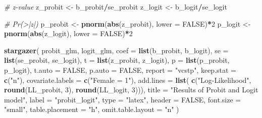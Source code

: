 \documentclass[
  12pt,
]{article}
\newenvironment{Shaded}{\begin{snugshade}}{\end{snugshade}}
\newcommand{\CommentTok}[1]{\textcolor[rgb]{0.56,0.35,0.01}{\textit{#1}}}
\newcommand{\DataTypeTok}[1]{\textcolor[rgb]{0.13,0.29,0.53}{#1}}
\newcommand{\DecValTok}[1]{\textcolor[rgb]{0.00,0.00,0.81}{#1}}
\newcommand{\KeywordTok}[1]{\textcolor[rgb]{0.13,0.29,0.53}{\textbf{#1}}}
\newcommand{\NormalTok}[1]{#1}
\newcommand{\OperatorTok}[1]{\textcolor[rgb]{0.81,0.36,0.00}{\textbf{#1}}}
\newcommand{\OtherTok}[1]{\textcolor[rgb]{0.56,0.35,0.01}{#1}}
\newcommand{\StringTok}[1]{\textcolor[rgb]{0.31,0.60,0.02}{#1}}
\begin{document}
\begin{Shaded}
\begin{Highlighting}[]
\CommentTok{\# z{-}value}
\NormalTok{z\_probit \textless{}{-}}\StringTok{ }\NormalTok{b\_probit}\OperatorTok{/}\NormalTok{se\_probit}
\NormalTok{z\_logit \textless{}{-}}\StringTok{ }\NormalTok{b\_logit}\OperatorTok{/}\NormalTok{se\_logit}

\CommentTok{\# Pr(\textgreater{}|z|)}
\NormalTok{p\_probit \textless{}{-}}\StringTok{ }\KeywordTok{pnorm}\NormalTok{(}\KeywordTok{abs}\NormalTok{(z\_probit), }\DataTypeTok{lower =} \OtherTok{FALSE}\NormalTok{)}\OperatorTok{*}\DecValTok{2}
\NormalTok{p\_logit \textless{}{-}}\StringTok{ }\KeywordTok{pnorm}\NormalTok{(}\KeywordTok{abs}\NormalTok{(z\_logit), }\DataTypeTok{lower =} \OtherTok{FALSE}\NormalTok{)}\OperatorTok{*}\DecValTok{2}

\KeywordTok{stargazer}\NormalTok{(}
\NormalTok{  probit\_glm, logit\_glm,}
  \DataTypeTok{coef =} \KeywordTok{list}\NormalTok{(b\_probit, b\_logit), }\DataTypeTok{se =} \KeywordTok{list}\NormalTok{(se\_probit, se\_logit),}
  \DataTypeTok{t =} \KeywordTok{list}\NormalTok{(z\_probit, z\_logit), }\DataTypeTok{p =} \KeywordTok{list}\NormalTok{(p\_probit, p\_logit),}
  \DataTypeTok{t.auto =} \OtherTok{FALSE}\NormalTok{, }\DataTypeTok{p.auto =} \OtherTok{FALSE}\NormalTok{,}
  \DataTypeTok{report =} \StringTok{"vcstp"}\NormalTok{, }\DataTypeTok{keep.stat =} \KeywordTok{c}\NormalTok{(}\StringTok{"n"}\NormalTok{),}
  \DataTypeTok{covariate.labels =} \KeywordTok{c}\NormalTok{(}\StringTok{"Female = 1"}\NormalTok{),}
  \DataTypeTok{add.lines =} \KeywordTok{list}\NormalTok{(}
    \KeywordTok{c}\NormalTok{(}\StringTok{"Log{-}Likelihood"}\NormalTok{, }\KeywordTok{round}\NormalTok{(LL\_probit, }\DecValTok{3}\NormalTok{), }\KeywordTok{round}\NormalTok{(LL\_logit, }\DecValTok{3}\NormalTok{))),}
  \DataTypeTok{title =} \StringTok{"Results of Probit and Logit model"}\NormalTok{,}
  \DataTypeTok{label =} \StringTok{"probit\_logit"}\NormalTok{,}
  \DataTypeTok{type =} \StringTok{"latex"}\NormalTok{, }\DataTypeTok{header =} \OtherTok{FALSE}\NormalTok{, }\DataTypeTok{font.size =} \StringTok{"small"}\NormalTok{,}
  \DataTypeTok{table.placement =} \StringTok{"h"}\NormalTok{, }\DataTypeTok{omit.table.layout =} \StringTok{"n"}
\NormalTok{)}
\end{Highlighting}
\end{Shaded}
\end{document}
